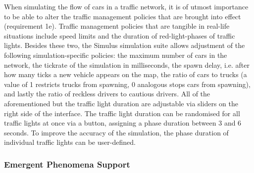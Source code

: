 When simulating the flow of cars in a traffic network, it is of utmost importance to be able to alter the traffic management policies that are brought into effect (requirement 1e). Traffic management policies that are tangible in real-life situations include speed limits and the duration of red-light-phases of traffic lights. Besides these two, the Simulus simulation suite allows adjustment of the following simulation-specific policies: the maximum number of cars in the network, the tickrate of the simulation in milliseconds, the spawn delay, i.e. after how many ticks a new vehicle appears on the map, the ratio of cars to trucks (a value of 1 restricts trucks from spawning, 0 analogous stops cars from spawning), and lastly the ratio of reckless drivers to cautious drivers. All of the aforementioned but the traffic light duration are adjustable via sliders on the right side of the interface. The traffic light duration can be randomised for all traffic lights at once via a button, assigning a phase duration between 3 and 6 seconds. To improve the accuracy of the simulation, the phase duration of individual traffic lights can be user-defined.

\subsubsection*{Emergent Phenomena Support}

